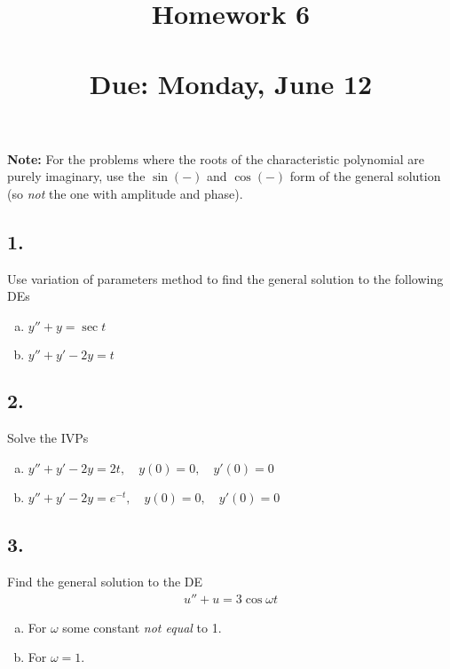


\title{Homework 6\\ \hfill \\ Due: Monday, June 12}


\maketitle
\thispagestyle{fancy}





\textbf{Note:} For the problems where the roots of the characteristic polynomial are purely imaginary, use the $\sin(-)$ and $\cos(-)$ form of the general solution (so \emph{not} the one with amplitude and phase).
\vspace{1em}

\subsection*{1. }
Use variation of parameters method to find the general solution to the following DEs

\begin{enumerate}[a)]
	\item $y'' + y = \sec t$
	\item $y''+y' -2y = t $
\end{enumerate}
\vspace{1em}


\subsection*{2. }
Solve the IVPs
\begin{enumerate}[a)]
	\item $ y''+y' -2y=2t, \quad y(0) = 0, \quad y'(0) = 0 $
	\item $ y''+y' -2y=e^{-t}, \quad y(0) = 0, \quad y'(0) = 0  $
\end{enumerate}
\vspace{1em}


\subsection*{3. }
Find the general solution to the DE
\begin{align*}
	u'' + u = 3 \cos \omega t
\end{align*}
\begin{enumerate}[a)]
	\item For $\omega$ some constant \emph{not equal} to 1.
	\item For $\omega = 1$.
\end{enumerate}
\vspace{1em}



